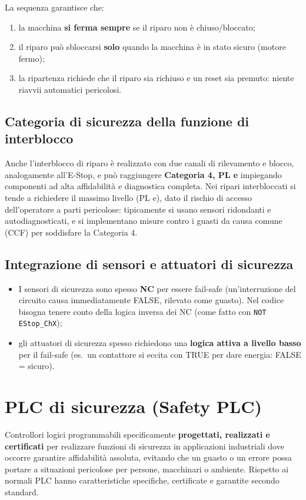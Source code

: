 La sequenza garantisce che:
\begin{enumerate}
    \item la macchina \textbf{si ferma sempre} se il riparo non è chiuso/bloccato;
    \item il riparo può sbloccarsi \textbf{solo} quando la macchina è in stato sicuro (motore fermo);
    \item la ripartenza richiede che il riparo sia richiuso e un reset sia premuto: niente riavvii automatici pericolosi.
\end{enumerate}

\subsection{Categoria di sicurezza della funzione di interblocco}
Anche l'interblocco di riparo è realizzato con due canali di rilevamento e blocco, analogamente all'E-Stop, e può raggiungere \textbf{Categoria 4, PL e} impiegando componenti ad alta affidabilità e diagnostica completa. Nei ripari interbloccati si tende a richiedere il massimo livello (PL e), dato il rischio di accesso dell'operatore a parti pericolose: tipicamente si usano sensori ridondanti e autodiagnosticati, e si implementano misure contro i guasti da causa comune (CCF) per soddisfare la Categoria 4.

\subsection{Integrazione di sensori e attuatori di sicurezza}
\begin{itemize}
    \item I sensori di sicurezza sono spesso \textbf{NC} per essere fail-safe (un'interruzione del circuito causa immediatamente FALSE, rilevato come guasto). Nel codice bisogna tenere conto della logica inversa dei NC (come fatto con \texttt{NOT EStop\_ChX});
    \item gli attuatori di sicurezza spesso richiedono una \textbf{logica attiva a livello basso} per il fail-safe (es.\ un contattore si eccita con TRUE per dare energia: FALSE = sicuro).
\end{itemize}

\section{PLC di sicurezza (Safety PLC)}
\begin{defn}
Controllori logici programmabili specificamente \textbf{progettati, realizzati e certificati} per realizzare funzioni di sicurezza in applicazioni industriali dove occorre garantire affidabilità assoluta, evitando che un guasto o un errore possa portare a situazioni pericolose per persone, macchinari o ambiente. Rispetto ai normali PLC hanno caratteristiche specifiche, certificate e garantite secondo standard.
\end{defn}

